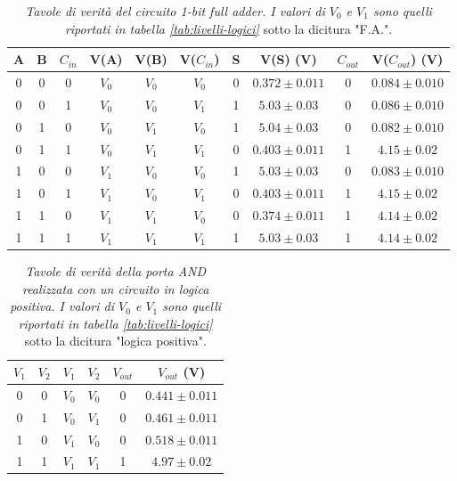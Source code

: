\begin{table}[H]
  \centering
  \begin{tabular}[t]{c  c  c | c  c  c | c  c | c  c}
    \hline
    A & B & $C_{in}$ & V(A) & V(B) & V($C_{in}$) & S & V(S) (V) & $C_{out}$ & V($C_{out}$) (V) \\
    \hline
    0 & 0 & 0 & $V_{0}$ & $V_{0}$ & $V_{0}$ & 0 & $0.372 \pm 0.011$   & 0 & $0.084 \pm 0.010 $\\
    0 & 0 & 1 & $V_{0}$ & $V_{0}$ & $V_{1}$ & 1 & $5.03 \pm 0.03$   & 0 & $0.086 \pm 0.010$\\
    0 & 1 & 0 & $V_{0}$ & $V_{1}$ & $V_{0}$ & 1 & $5.04 \pm 0.03$   & 0 & $0.082 \pm 0.010$\\
    0 & 1 & 1 & $V_{0}$ & $V_{1}$ & $V_{1}$ & 0 & $0.403 \pm 0.011$ & 1 & $4.15 \pm 0.02$\\
    1 & 0 & 0 & $V_{1}$ & $V_{0}$ & $V_{0}$ & 1 & $5.03 \pm 0.03$   & 0 & $0.083 \pm 0.010$\\
    1 & 0 & 1 & $V_{1}$ & $V_{0}$ & $V_{1}$ & 0 & $0.403 \pm 0.011$ & 1 & $4.15 \pm 0.02$\\
    1 & 1 & 0 & $V_{1}$ & $V_{1}$ & $V_{0}$ & 0 & $0.374 \pm 0.011$ & 1 & $4.14 \pm 0.02$\\
    1 & 1 & 1 & $V_{1}$ & $V_{1}$ & $V_{1}$ & 1 & $5.03 \pm 0.03$   & 1 & $4.14 \pm 0.02$\\
    \hline
  \end{tabular}
  \caption{\emph{Tavole di verità del circuito \emph{1-bit full adder}. I valori di $V_{0}$ e $V_{1}$ sono quelli riportati in tabella \ref{tab:livelli-logici}} sotto la dicitura "F.A.".}
  \label{tab:fulladder}
\end{table}

\begin{table}[H]
  \centering
  \begin{tabular}[t]{c  c | c  c | c  c}
    \hline
    $V_{1}$ & $V_{2}$ & $V_{1}$ & $V_{2}$ & $V_{out}$ & $V_{out}$ (V) \\
    \hline
    0 & 0 & $V_{0}$ & $V_{0}$ & 0 & $0.441 \pm 0.011$ \\
    0 & 1 & $V_{0}$ & $V_{1}$ & 0 & $0.461 \pm 0.011$ \\
    1 & 0 & $V_{1}$ & $V_{0}$ & 0 & $0.518 \pm 0.011$ \\
    1 & 1 & $V_{1}$ & $V_{1}$ & 1 & $4.97 \pm 0.02$ \\
    \hline
  \end{tabular}
  \caption{\emph{Tavole di verità della porta \emph{AND} realizzata con un circuito in logica positiva. I valori di $V_{0}$ e $V_{1}$ sono quelli riportati in tabella \ref{tab:livelli-logici}} sotto la dicitura "logica positiva".}
  \label{tab:and-logicapositiva}
\end{table}

